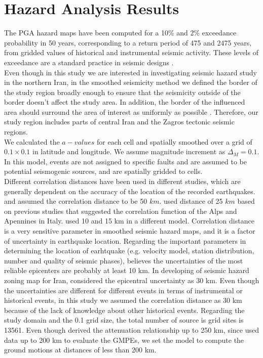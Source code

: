 \section{Hazard Analysis Results}

The PGA hazard maps have been computed for a 10\% and 2\% exceedance probability in 50 years, corresponding to a return period of 475 and 2475 years, from gridded values of historical and instrumental seismic activity. These levels of exceedance are a standard practice in seismic designs \citep{BHRC2014}.\\
\noindent
Even though in this study we are interested in investigating seismic hazard study in the northern Iran, in the smoothed seismicity method we defined the border of the study region broadly enough to ensure that the seismicity outside of the border doesn't affect the study area.  In addition, the border of the influenced area should surround the area of interest as uniformly as possible \citep{Lapajne1997}. Therefore, our study region includes parts of central Iran and the Zagros tectonic seismic regions.\\
\noindent
We calculated the $a-values$ for each cell and spatially smoothed over a grid of $0.1 \times 0.1$ in latitude and longitude. We assume magnitude increment as $\Delta_M = 0.1$. In this model, events are not assigned to specific faults and are assumed to be potential seismogenic sources, and are spatially gridded to cells. \\
\noindent
Different correlation distances have been used in different studies, which are generally dependent on the accuracy of the location of the recorded earthquakes. \citet{Frankel1995} and \citet{Boyd2008} assumed the correlation distance to be 50 $km$. \citet{Barani2007} used distance of 25 $km$ based on previous studies that suggested the correlation function of the Alps and Apennines in Italy. \citet{Foteva2006} used 10 and 15 km in a different model. Correlation distance is a very sensitive parameter in smoothed seismic hazard maps, and it is a factor of uncertainty in earthquake location.
Regarding the important parameters in determining the location of earhtquake (e.g. velocity model, station distribution, number and quality of seismic phases),\citet{Mirzaei1997} believes the uncertainties of the most reliable epicenters are probably at least 10 km. In developing of seismic hazard zoning map for Iran,\citet{Zare2012} considered the epicentral uncertainty as 30 km. Even though the uncertainties are different for different events in terms of instrumental or historical events, in this study we assumed the correlation distance as 30 km because of the lack of knowledge about other historical events. Regarding the study domain and the 0.1 grid size, the total number of source is grid sites is 13561. Even though \citet{Kalkan2004} derived the attenuation relationship up to 250 km, since \citet{Zafarani2014} used data up to 200 km to evaluate the GMPEs, we set the model to compute the ground motions at distances of less than 200 km.



